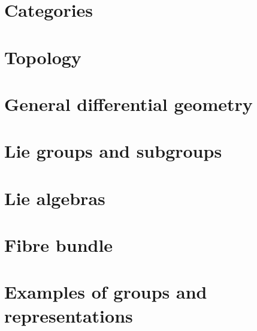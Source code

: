 



\makeindex
\makenomenclature




    

\newpage




        \printnomenclature
        \printindex

    \tableofcontents



\pagestyle{headings}

\chapter{Categories}        \label{chap_category}


\chapter{Topology}              \label{chap_topology}



\chapter{General differential geometry} \label{Chapitre_FB}


\chapter{Lie groups and subgroups}


\chapter{Lie algebras}



\chapter{Fibre bundle}


\chapter{Examples of groups and representations}        \label{ChapThoComsGroupes}



